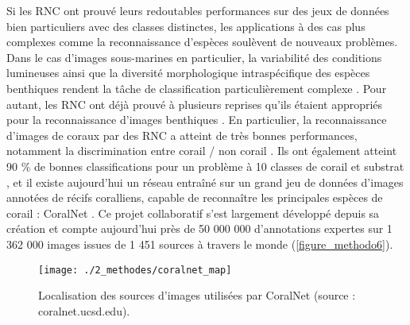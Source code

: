 Si les RNC ont prouvé leurs redoutables performances sur des jeux de données bien particuliers avec des classes distinctes, les applications à des cas plus complexes comme la reconnaissance d’espèces soulèvent de nouveaux problèmes. Dans le cas d’images sous-marines en particulier, la variabilité des conditions lumineuses ainsi que la diversité morphologique intraspécifique des espèces benthiques rendent la tâche de classification particulièrement complexe \citep{beijbom_automated_2012}. Pour autant, les RNC ont déjà prouvé à plusieurs reprises qu’ils étaient appropriés pour la reconnaissance d’images benthiques \citep{raphael_neural_2020}. En particulier, la reconnaissance d’images de coraux par des RNC a atteint de très bonnes performances, notamment la discrimination entre corail / non corail \citep{manderson_robotic_2017, williams_leveraging_2019}. Ils ont également atteint 90 \% de bonnes classifications pour un problème à 10 classes de corail et substrat \citep{king_comparison_2018}, et il existe aujourd’hui un réseau entraîné sur un grand jeu de données d’images annotées de récifs coralliens, capable de reconnaître les principales espèces de corail : CoralNet \citep{beijbom_towards_2015}. Ce projet collaboratif s’est largement développé depuis sa création et compte aujourd’hui près de 50 000 000 d’annotations expertes sur 1 362 000 images issues de 1 451 sources à travers le monde (\autoref{figure_methodo6}).

\begin{figure}[H]
	\begin{center}
	\texttt{[image: ./2\_methodes/coralnet\_map]}
		\caption[Localisation des sources d’images utilisées par CoralNet]{Localisation des sources d’images utilisées par CoralNet (source : coralnet.ucsd.edu).}
	\label{figure_methodo6}
\end{center}
\end{figure}

\setlength{\fboxsep}{5pt}
\setlength{\fboxrule}{0.6pt}
\noindent{}

